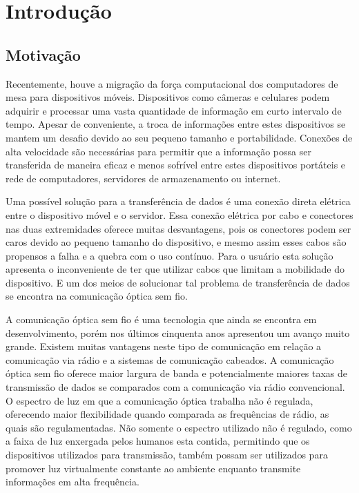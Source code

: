 \chapter[INTRODUÇÃO]{Introdução}

\section{Motivação}

Recentemente, houve a migração da força computacional dos computadores de mesa para dispositivos móveis. Dispositivos como câmeras e celulares podem adquirir e processar uma vasta quantidade de informação em curto intervalo de tempo. Apesar de conveniente, a troca de informações entre estes dispositivos se mantem um desafio devido ao seu pequeno tamanho e portabilidade. Conexões de alta velocidade são necessárias para permitir que a informação possa ser transferida de maneira eficaz e menos sofrível entre estes dispositivos portáteis e rede de computadores, servidores de armazenamento ou internet. 

Uma possível solução para a transferência de dados é uma conexão direta elétrica entre o dispositivo móvel e o servidor. Essa conexão elétrica por cabo e conectores nas duas extremidades oferece muitas desvantagens, pois os conectores podem ser caros devido ao pequeno tamanho do dispositivo, e mesmo assim esses cabos são propensos a falha e a quebra com o uso contínuo. 
Para o usuário esta solução apresenta o inconveniente de ter que utilizar cabos que limitam a mobilidade do dispositivo. E um dos meios de solucionar tal problema de transferência de dados se encontra na comunicação óptica sem fio.

A comunicação óptica sem fio é uma tecnologia que ainda se encontra em desenvolvimento, porém nos últimos cinquenta anos apresentou um avanço muito grande. Existem muitas vantagens neste tipo de comunicação em relação a comunicação via rádio e a sistemas de comunicação cabeados. A comunicação óptica sem fio oferece maior largura de banda e potencialmente maiores taxas de transmissão de dados se comparados com a comunicação via rádio convencional.
O espectro de luz em que a comunicação óptica trabalha não é regulada, oferecendo maior flexibilidade quando comparada as frequências de rádio, as quais são regulamentadas. Não somente o espectro utilizado não é regulado, como a faixa de luz enxergada pelos humanos esta contida, permitindo que os dispositivos utilizados para transmissão, também possam ser utilizados para promover luz virtualmente constante ao ambiente enquanto transmite informações em alta frequência.\cite{Hranilovic}

